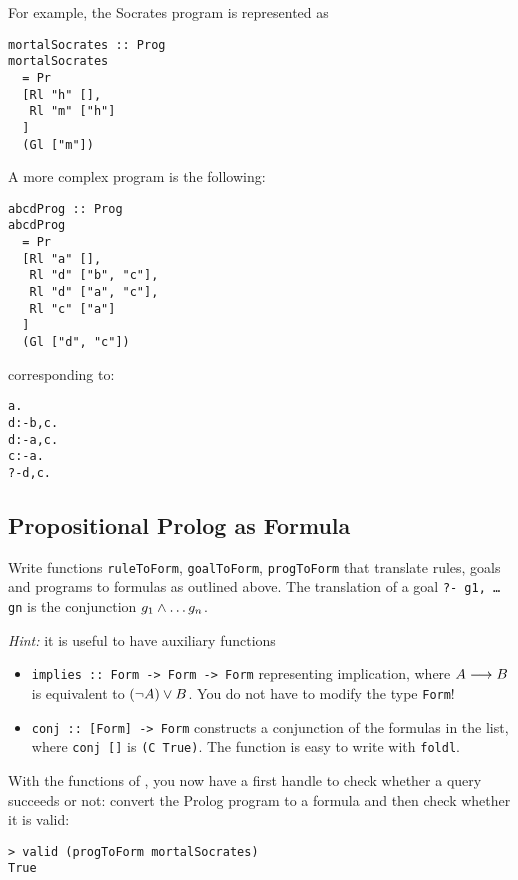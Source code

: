 \documentclass[english]{article}
\begin{document}
For example, the Socrates program is represented as
\begin{lstlisting}
mortalSocrates :: Prog
mortalSocrates
  = Pr
  [Rl "h" [],
   Rl "m" ["h"]
  ]
  (Gl ["m"])
\end{lstlisting}

A more complex program is the following:

\begin{lstlisting}
abcdProg :: Prog
abcdProg
  = Pr
  [Rl "a" [],
   Rl "d" ["b", "c"],
   Rl "d" ["a", "c"],
   Rl "c" ["a"]
  ]
  (Gl ["d", "c"])
\end{lstlisting}
corresponding to:

\begin{alltt}
  a.
  d :- b, c.
  d :- a, c.
  c :- a.
  ?- d, c.
\end{alltt}

  
\subsection{Propositional Prolog as Formula}\label{sec:prolog_as_formula}

\begin{exo}\label{exo:pp_prog_to_form}
Write functions \texttt{ruleToForm}, \texttt{goalToForm}, \texttt{progToForm}
that translate rules, goals and programs to formulas as outlined above. The
translation of a goal \texttt{?- g1, \dots gn} is the conjunction $g_1 \land
\dots g_n$.

\emph{Hint:} it is useful to have auxiliary functions
\begin{itemize}
\item \texttt{implies :: Form -> Form -> Form} representing implication, where
  $A \longrightarrow B$ is equivalent to $(\lnot A) \lor B$. You do not have to modify the
  type \texttt{Form}!
\item \texttt{conj :: [Form] -> Form} constructs a conjunction of the formulas
  in the list, where \texttt{conj []} is \texttt{(C True)}. The function is
  easy to write with \texttt{foldl}. 
\end{itemize}
\end{exo}

With the functions of , you now have a first
handle to check whether a query succeeds or not: convert the Prolog program to
a formula and then check whether it is valid:

\begin{lstlisting}
> valid (progToForm mortalSocrates)
True
\end{lstlisting}
\end{document}
